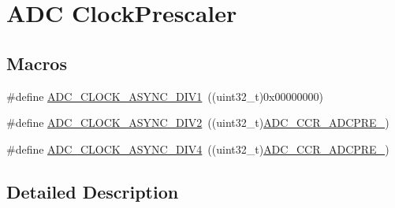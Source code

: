 \hypertarget{group___a_d_c___clock_prescaler}{\section{A\-D\-C Clock\-Prescaler}
\label{group___a_d_c___clock_prescaler}
}
\subsection*{Macros}
\begin{DoxyCompactItemize}
\item 
\#define \hyperlink{group___a_d_c___clock_prescaler_ga092c0277fd6db9b905d229c9f8dda8ab}{A\-D\-C\-\_\-\-C\-L\-O\-C\-K\-\_\-\-A\-S\-Y\-N\-C\-\_\-\-D\-I\-V1}~((uint32\-\_\-t)0x00000000)
\item 
\#define \hyperlink{group___a_d_c___clock_prescaler_gacf4ae9c70dd75168acf17fbce10af8b8}{A\-D\-C\-\_\-\-C\-L\-O\-C\-K\-\_\-\-A\-S\-Y\-N\-C\-\_\-\-D\-I\-V2}~((uint32\-\_\-t)\hyperlink{group___peripheral___registers___bits___definition_gaf3108cc8fb81f6efd1e93fa5f82ac313}{A\-D\-C\-\_\-\-C\-C\-R\-\_\-\-A\-D\-C\-P\-R\-E\-\_})
\item 
\#define \hyperlink{group___a_d_c___clock_prescaler_ga5fb738b8222dfdbceb02a0ad041f5da5}{A\-D\-C\-\_\-\-C\-L\-O\-C\-K\-\_\-\-A\-S\-Y\-N\-C\-\_\-\-D\-I\-V4}~((uint32\-\_\-t)\hyperlink{group___peripheral___registers___bits___definition_gafa090830d2d359db04f365d46c6644d5}{A\-D\-C\-\_\-\-C\-C\-R\-\_\-\-A\-D\-C\-P\-R\-E\-\_})
\end{DoxyCompactItemize}


\subsection{Detailed Description}


